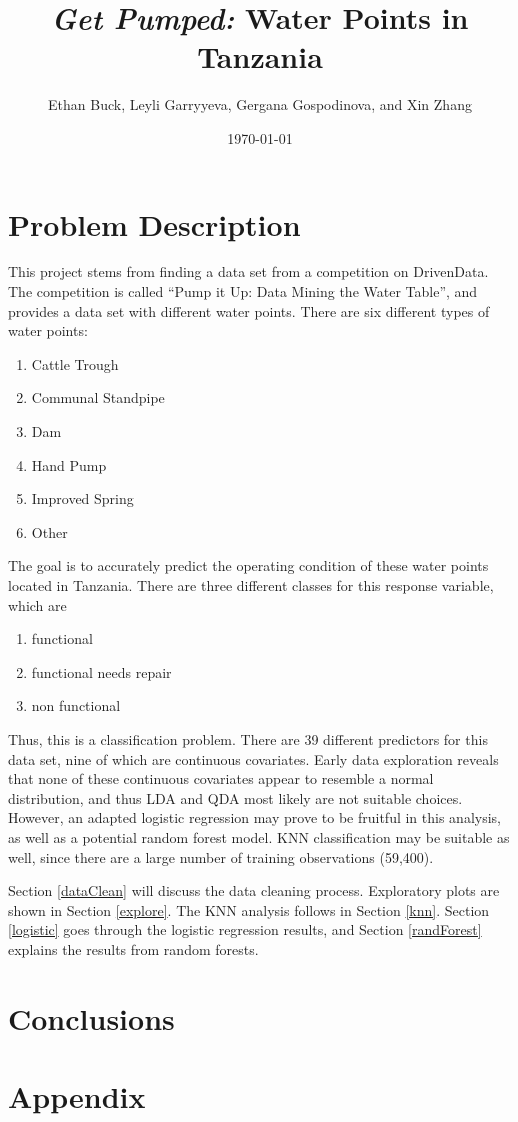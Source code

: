 \documentclass{article}
\title{\textit{Get Pumped:} Water Points in Tanzania}
\author{Ethan Buck, Leyli Garryyeva, Gergana Gospodinova, and Xin Zhang}
\date{\today}
\begin{document}
\maketitle

\section{Problem Description}
This project stems from finding a data set from a competition on DrivenData.  The competition is called ``Pump it Up: Data Mining the Water Table'', and provides a data set with different water points.  There are six different types of water points:

\begin{enumerate}
    \item Cattle Trough
    \item Communal Standpipe
    \item Dam
    \item Hand Pump
    \item Improved Spring
    \item Other
\end{enumerate}

The goal is to accurately predict the operating condition of these water points located in Tanzania.  There are three different classes for this response variable, which are

\begin{enumerate}
    \item functional
    \item functional needs repair
    \item non functional
\end{enumerate}

Thus, this is a classification problem.  There are 39 different predictors for this data set, nine of which are continuous covariates.  Early data exploration reveals that none of these continuous covariates appear to resemble a normal distribution, and thus LDA and QDA most likely are not suitable choices.  However, an adapted logistic regression may prove to be fruitful in this analysis, as well as a potential random forest model.  KNN classification may be suitable as well, since there are a large number of training observations (59,400).

Section \ref{dataClean} will discuss the data cleaning process.  Exploratory plots are shown in Section \ref{explore}.  The KNN analysis follows in Section \ref{knn}.  Section \ref{logistic} goes through the logistic regression results, and Section \ref{randForest} explains the results from random forests.











\section{Conclusions}

\newpage
\section{Appendix}


\end{document}
